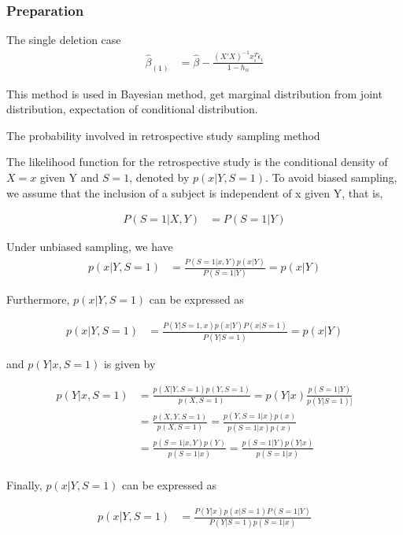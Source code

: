 \documentclass[11pt]{article} %
\begin{document}
  \subsubsection{Preparation}
  The single deletion case
  \begin{align*}
  	\hat{\beta}_{(1)} & = \hat{\beta} - \frac{(X'X)^{-1} x_i^T \hat{\epsilon}_i}{1-h_{ii}}
  \end{align*} 	
  
  This method is used in Bayesian method, get marginal distribution from joint distribution, expectation of conditional distribution.
  
  The probability involved in retrospective study sampling method
  
  The likelihood function for the retrospective study is the conditional density of $X=x$ given Y and $S=1$, denoted by $p(x|Y, S=1)$. To avoid biased sampling, we assume that the inclusion of a subject is independent of x given Y, that is,
  
   \begin{align*}
  	P(S=1| X, Y) &= P(S=1|Y)
  \end{align*} 	

Under unbiased sampling, we have 
   \begin{align*}
	p(x|Y, S=1) &= \frac{P(S=1| x, Y) p(x|Y)}{P(S=1|Y)} = p(x|Y)
\end{align*} 	

Furthermore, $p(x|Y, S=1)$ can be expressed as 

 \begin{align*}
	p(x|Y, S=1) &= \frac{P(Y|S=1, x) p(x|Y)P(x|S=1)}{P(Y|S=1)} = p(x|Y)
\end{align*} 	

and $p(Y|x, S=1)$ is given by

 \begin{align*}
	p(Y|x, S=1) &= \frac{p(X|Y,S=1) p(Y, S=1)}{p(X, S=1)} = p(Y|x) \frac{p(S=1|Y)}{p(Y|S=1)]}\\
	&=  \frac{p(X, Y,S=1) }{p(X, S=1)}  = \frac{p(Y,S=1|x) p(x) }{p(S=1|x) p(x)}  \\
	&= \frac{p(S=1|x,Y) p(Y)}{p(S=1|x) }  = \frac{p(S=1|Y) p(Y|x)}{p(S=1|x) } \\
\end{align*} 	

Finally, $p(x|Y, S=1)$ can be expressed as

 \begin{align*}
	p(x|Y, S=1) &= \frac{P(Y|x) p(x|S=1) P(S=1|Y)}{P(Y|S=1) p(S=1|x)}
\end{align*} 	
\end{document}
